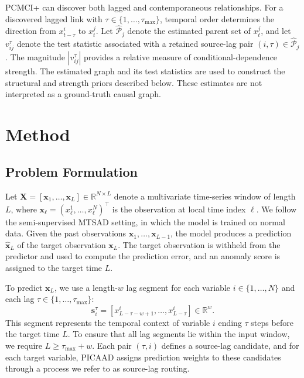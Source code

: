 \documentclass[letterpaper]{article}
\begin{document}
PCMCI+ can discover both lagged and contemporaneous relationships. For a discovered lagged link with $\tau\in\{1,\ldots,\tau_{\max}\}$, temporal order determines the direction from $x^i_{t-\tau}$ to $x^j_t$. Let $\widehat{\mathcal{P}}_j$ denote the estimated parent set of $x^j_t$, and let $v^\tau_{ij}$ denote the test statistic associated with a retained source-lag pair $(i,\tau)\in\widehat{\mathcal{P}}_j$. The magnitude $|v^\tau_{ij}|$ provides a relative measure of conditional-dependence strength. The estimated graph and its test statistics are used to construct the structural and strength priors described below. These estimates are not interpreted as a ground-truth causal graph.

\section{Method}

\subsection{Problem Formulation}
Let $\mathbf{X}=[\mathbf{x}_1,\ldots,\mathbf{x}_L]\in\mathbb{R}^{N\times L}$ denote a multivariate time-series window of length $L$, where $\mathbf{x}_\ell=(x^1_\ell,\ldots,x^N_\ell)^\top$ is the observation at local time index $\ell$. We follow the semi-supervised MTSAD setting, in which the model is trained on normal data. Given the past observations $\mathbf{x}_1,\ldots,\mathbf{x}_{L-1}$, the model produces a prediction $\hat{\mathbf{x}}_L$ of the target observation $\mathbf{x}_L$. The target observation is withheld from the predictor and used to compute the prediction error, and an anomaly score is assigned to the target time $L$.

To predict $\mathbf{x}_L$, we use a length-$w$ lag segment for each variable $i\in\{1,\ldots,N\}$ and each lag $\tau\in\{1,\ldots,\tau_{\max}\}$:
\begin{equation}
\mathbf{s}^\tau_i=[x^i_{L-\tau-w+1},\ldots,x^i_{L-\tau}]\in\mathbb{R}^w .
\label{eq:segment}
\end{equation}
This segment represents the temporal context of variable $i$ ending $\tau$ steps before the target time $L$. To ensure that all lag segments lie within the input window, we require $L\ge\tau_{\max}+w$. Each pair $(\tau,i)$ defines a source-lag candidate, and for each target variable, PICAAD assigns prediction weights to these candidates through a process we refer to as source-lag routing.
\end{document}
